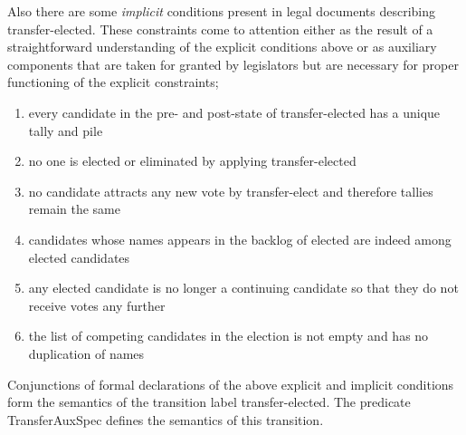 \documentclass[10pt,conference]{IEEEtran}
\begin{document}
Also there are some \emph{implicit} conditions present in legal documents describing transfer-elected. These constraints come to attention either as the result of a straightforward understanding of the explicit conditions above or as   auxiliary components that are taken for granted by legislators but are
necessary for proper functioning of the explicit constraints;
\begin{enumerate}
\item every candidate in the pre- and post-state of transfer-elected has a unique tally and pile
\item no one is elected or eliminated by applying transfer-elected
\item no candidate attracts any new vote by transfer-elect and therefore tallies remain the same
\item candidates whose names appears in the backlog of elected are indeed among elected candidates
\item any elected candidate is no longer a continuing candidate so that they do not receive votes any further
\item the list of competing candidates in the election is not empty and has no duplication of names
\end{enumerate}  
Conjunctions of formal declarations of the above explicit and implicit conditions form the semantics of the transition label transfer-elected.   The predicate TransferAuxSpec defines  the semantics of this transition.
\end{document}
